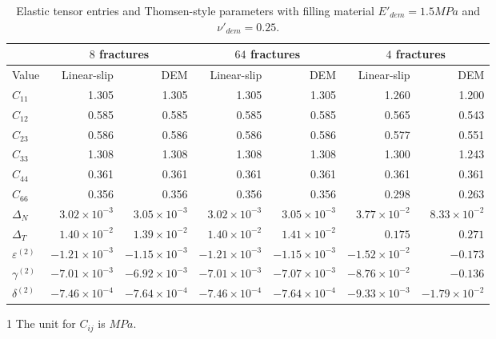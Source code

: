 \documentclass[review,authoryear]{elsarticle}
\begin{document}
\begin{table}
\centering
\begin{threeparttable}
\caption{Elastic tensor entries and Thomsen-style parameters with filling material $E'_{dem} = 1.5 MPa$ and $\nu'_{dem} = 0.25$.}
\begin{tabular}{lrr|rr|rr}
\hline\hline
& \multicolumn{2}{c|}{$8$ fractures}& \multicolumn{2}{c|}{$64$ fractures } & \multicolumn{2}{c}{$4$ fractures}\\
\hline
Value\tnote{1} & Linear-slip & DEM & Linear-slip & DEM & Linear-slip & DEM\\
\hline
$C_{11}$ 		& 1.305 & 1.305 & 1.305 & 1.305 & 1.260 & 1.200 \\
$C_{12}$ 		& 0.585 & 0.585 & 0.585 & 0.585 & 0.565 & 0.543 \\
$C_{23}$ 		& 0.586 & 0.586 & 0.586 & 0.586 & 0.577 & 0.551 \\
$C_{33}$ 		& 1.308 & 1.308 & 1.308 & 1.308 & 1.300 & 1.243 \\
$C_{44}$ 		& 0.361 & 0.361 & 0.361 & 0.361 & 0.361 & 0.361 \\
$C_{66}$ 		& 0.356 & 0.356 & 0.356 & 0.356 & 0.298 & 0.263 \\
$\Delta_N$  	& $3.02{\times}10^{-3}$ & $3.05{\times}10^{-3}$ & $3.02{\times}10^{-3}$ & $3.05{\times}10^{-3}$ & $3.77{\times}10^{-2}$ & $8.33{\times}10^{-2}$ \\
$\Delta_T$	    & $1.40{\times}10^{-2}$ & $1.39{\times}10^{-2}$ & $1.40{\times}10^{-2}$ & $1.41{\times}10^{-2}$ & $0.175$ & $0.271$ \\
$\varepsilon^{(2)}$ & $-1.21{\times}10^{-3}$ & $-1.15{\times}10^{-3}$ & $-1.21{\times}10^{-3}$ & $-1.15{\times}10^{-3}$ & $-1.52{\times}10^{-2}$ & $-0.173$  \\
$\gamma^{(2)}$  & $-7.01{\times}10^{-3}$ & $-6.92{\times}10^{-3}$ & $-7.01{\times}10^{-3}$ &  $-7.07{\times}10^{-3}$ & $-8.76{\times}10^{-2}$ & $-0.136$ \\
$\delta^{(2)}$ & $-7.46{\times}10^{-4}$ & $-7.64{\times}10^{-4}$ & $-7.46{\times}10^{-4}$ & $-7.64{\times}10^{-4}$ & $-9.33{\times}10^{-3}$ & $-1.79{\times}10^{-2}$ \\
\hline    
\bottomrule
\end{tabular}\label{TABLE:DENSITY}
\begin{tablenotes}
  \item [1] The unit for $C_{ij}$ is $MPa$.
\end{tablenotes}
\end{threeparttable}
\end{table}
\end{document}
